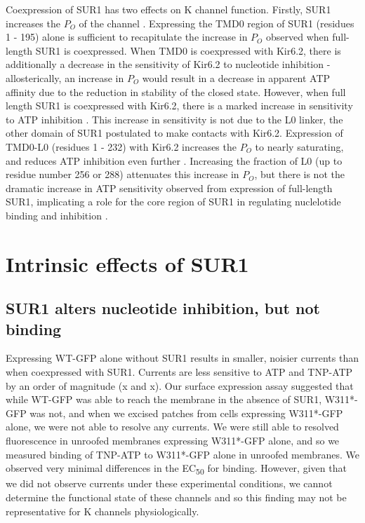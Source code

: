 Coexpression of SUR1 has two effects on K\ATP{} channel function.
Firstly, SUR1 increases the $P_O$ of the channel \cite{tucker_truncation_1997, john_sulphonylurea_1998, chan_n-terminal_2003-1}.
Expressing the TMD0 region of SUR1 (residues 1 - 195) alone is sufficient to recapitulate the increase in $P_O$ observed when full-length SUR1 is coexpressed\cite{babenko_sur_2003-1, chan_n-terminal_2003-1}.
When TMD0 is coexpressed with Kir6.2, there is additionally a decrease in the sensitivity of Kir6.2 to nucleotide inhibition - allosterically, an increase in $P_O$ would result in a decrease in apparent ATP affinity due to the reduction in stability of the closed state.
However, when full length SUR1 is coexpressed with Kir6.2, there is a marked increase in sensitivity to ATP inhibition \cite{tucker_truncation_1997, john_sulphonylurea_1998, chan_n-terminal_2003-1, ribalet_atp-sensitive_2006}.
This increase in sensitivity is not due to the L0 linker, the other domain of SUR1 postulated to make contacts with Kir6.2.
Expression of TMD0-L0 (residues 1 - 232) with Kir6.2 increases the $P_O$ to nearly saturating, and reduces ATP inhibition even further \cite{babenko_sur_2003-1}.
Increasing the fraction of L0 (up to residue number 256 or 288) attenuates this increase in $P_O$, but there is not the dramatic increase in ATP sensitivity observed from expression of full-length SUR1, implicating a role for the core region of SUR1 in regulating nuclelotide binding and inhibition \cite{puljung_cryo-electron_2018}.

\section{Intrinsic effects of SUR1}

\subsection{SUR1 alters nucleotide inhibition, but not binding}
Expressing WT-GFP alone without SUR1 results in smaller, noisier currents than when coexpressed with SUR1.
Currents are less sensitive to ATP and TNP-ATP by an order of magnitude (x and x).
Our surface expression assay suggested that while WT-GFP was able to reach the membrane in the absence of SUR1, W311*-GFP was not, and when we excised patches from cells expressing W311*-GFP alone, we were not able to resolve any currents.
We were still able to resolved fluorescence in unroofed membranes expressing W311*-GFP alone, and so we measured binding of TNP-ATP to W311*-GFP alone in unroofed membranes.
We observed very minimal differences in the EC\textsubscript{50} for binding.
However, given that we did not observe currents under these experimental conditions, we cannot determine the functional state of these channels and so this finding may not be representative for K\ATP{} channels physiologically.

